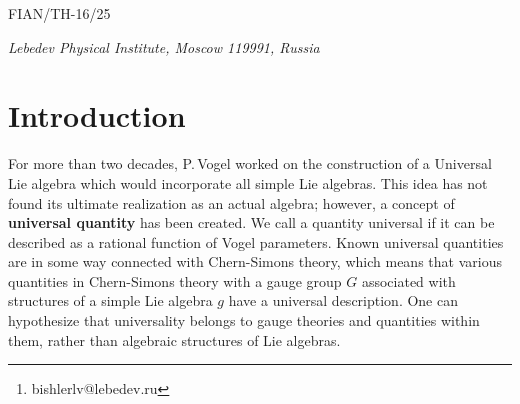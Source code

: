 \documentclass{article}
\begin{document}
\title{
	\author{\ {\bf Liudmila Bishler\footnote{bishlerlv@lebedev.ru}}
	\date{ }
}}

\maketitle

\vspace{-4.5cm}

\begin{center}
	\hfill FIAN/TH-16/25
\end{center}

\vspace{3.0cm}

\begin{center}
	{\small {\it Lebedev Physical Institute, Moscow 119991, Russia}}\\
\end{center}

\vspace{.1cm}

\begin{abstract}
We discuss algebraic universality in the sense of P.~Vogel for the simplest refined quantity, the Macdonald dimensions. The main known source of universal quantities is given by Chern-Simons theory.
Refinement of Chern-Simons theory means introducing additional parameters. At the level of symmetric functions, the refinement is the transition from the Schur functions to the Macdonald polynomials. We consider the Macdonald polynomials associated with the simple Lie algebras, define Macdonald dimensions and dual Macdonald dimensions, and present a universal formula for them that unifies these quantities for algebras associated with simply laced root systems. We also consider mixed Macdonald dimensions that depend on two different root systems.
\end{abstract}

\section{Introduction}

For more than two decades, P.\,Vogel \cite{Vogel95,Vogel99} worked on the construction of a Universal Lie algebra which would incorporate all simple Lie algebras. This idea has not found its ultimate realization as an actual algebra; however, a concept of \textbf{universal quantity} has been created. We call a quantity universal if it can be described as a rational function of Vogel parameters. Known universal quantities are in some way connected with Chern-Simons theory, which means that various quantities in Chern-Simons theory with a gauge group $G$ associated with structures of a simple Lie algebra $g$ have a universal description. One can hypothesize that universality belongs to gauge theories and quantities within them, rather than algebraic structures of Lie algebras.  
\end{document}
